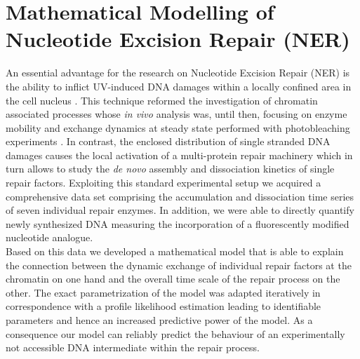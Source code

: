 \chapter{Mathematical Modelling of Nucleotide Excision Repair (NER)}
\pagestyle{plain}
%
An essential advantage for the research on Nucleotide Excision Repair (NER) is the ability to inflict UV-induced DNA damages within a locally confined area in the cell nucleus \cite{Mone2001}. This technique reformed the investigation of chromatin associated processes whose \textit{in vivo} analysis was, until then, focusing on enzyme mobility and exchange dynamics at steady state performed with photobleaching experiments \cite{Houtsmuller2001,Mone2004}. In contrast, the enclosed distribution of single stranded DNA damages causes the local activation of a multi-protein repair machinery which in turn allows to study the \textit{de novo} assembly and dissociation kinetics of single repair factors. Exploiting this standard experimental setup we acquired a comprehensive data set comprising the accumulation and dissociation time series of seven individual repair enzymes. In addition, we were able to directly quantify newly synthesized DNA measuring the incorporation of a fluorescently modified nucleotide analogue.\\
Based on this data we developed a mathematical model that is able to explain the connection between the dynamic exchange of individual repair factors at the chromatin on one hand and the overall time scale of the repair process on the other. The exact parametrization of the model was adapted iteratively in correspondence with a profile likelihood estimation leading to identifiable parameters and hence an increased predictive power of the model. As a consequence our model can reliably predict the behaviour of an experimentally not accessible DNA intermediate within the repair process.\\
   
